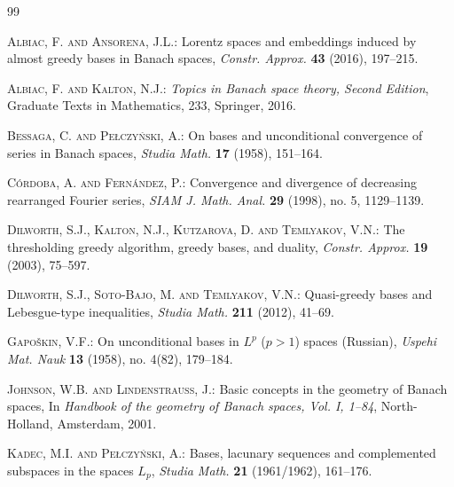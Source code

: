 \documentclass[11pt, leqno]{amsart}
\theoremstyle{remark}
\numberwithin{equation}{section}
\begin{document}
\begin{thebibliography}{99}

\newcommand{\RMIauthor}[1]{\textsc{#1}:}
\newcommand{\RMIpaper}[1]{\textnormal{#1},}
\newcommand{\RMIjournal}[1]{\textit{#1}}
\newcommand{\RMIbook}[1]{\textit{#1},}

\RMIauthor{Albiac, F. and Ansorena, J.L.}
\RMIpaper{Lorentz spaces and embeddings induced by almost greedy bases in Banach spaces}
\RMIjournal{Constr. Approx.} 
\textbf{43} (2016), 197--215.

\RMIauthor{Albiac, F. and Kalton, N.J.}
\RMIbook{Topics in Banach space theory, Second Edition}
Graduate Texts in Mathematics, 233, Springer, 2016.

\RMIauthor{Bessaga, C. and Pe{\l}czy{\'n}ski, A.}
\RMIpaper{On bases and unconditional convergence of series in Banach spaces}
\RMIjournal{Studia Math.} 
\textbf{17} (1958), 151--164.

\RMIauthor{C{\'o}rdoba, A. and Fern{\'a}ndez, P.}
\RMIpaper{Convergence and divergence of decreasing rearranged Fourier series}
\RMIjournal{SIAM J. Math. Anal.} 
\textbf{29} (1998), no. 5, 1129--1139.

\RMIauthor{Dilworth, S.J., Kalton, N.J., Kutzarova, D. and Temlyakov, V.N.}
\RMIpaper{The thresholding greedy algorithm, greedy bases, and duality}
\RMIjournal{Constr. Approx.} 
\textbf{19} (2003), 75--597.

\RMIauthor{Dilworth, S.J., Soto-Bajo, M. and Temlyakov, V.N.}
\RMIpaper{Quasi-greedy bases and Lebesgue-type inequalities}
\RMIjournal{Studia Math.} 
\textbf{211} (2012), 41--69.

\RMIauthor{Gapo{\v{s}}kin, V.F.}
\RMIpaper{On unconditional bases in $L^{p}$ ($p>1$) spaces (Russian)}
\RMIjournal{Uspehi Mat. Nauk} 
\textbf{13} (1958), no. 4(82), 179--184.

\RMIauthor{Johnson, W.B. and Lindenstrauss, J.}
\RMIpaper{Basic concepts in the geometry of Banach spaces}
In \RMIbook{Handbook of the geometry of Banach spaces, Vol. I, {\rm 1--84}}
North-Holland, Amsterdam, 2001.

\RMIauthor{Kadec, M.I. and Pe{\l}czy{\'n}ski, A.}
\RMIpaper{Bases, lacunary sequences and complemented subspaces in the spaces $L_{p}$}
\RMIjournal{Studia Math.} 
\textbf{21} (1961/1962), 161--176.


\end{thebibliography}
\end{document}
